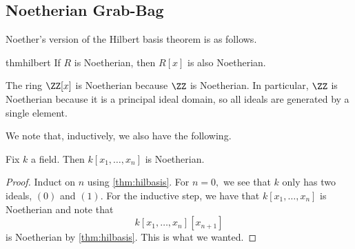 \subsection{Noetherian Grab-Bag}
Noether's version of the Hilbert basis theorem is as follows.
\begin{restatable}{thm}{hilbert} \label{thm:hilbasis}
	If $R$ is Noetherian, then $R[x]$ is also Noetherian.
\end{restatable}
\begin{ex}
	The ring $\ZZ[x]$ is Noetherian because $\ZZ$ is Noetherian. In particular, $\ZZ$ is Noetherian because it is a principal ideal domain, so all ideals are generated by a single element.
\end{ex}
We note that, inductively, we also have the following.
\begin{cor}
	Fix $k$ a field. Then $k[x_1,\ldots,x_n]$ is Noetherian.
\end{cor}
\begin{proof}
	Induct on $n$ using \autoref{thm:hilbasis}. For $n=0,$ we see that $k$ only has two ideals, $(0)$ and $(1).$ For the inductive step, we have that $k[x_1,\ldots,x_n]$ is Noetherian and note that
	\[k[x_1,\ldots,x_n][x_{n+1}]\]
	is Noetherian by \autoref{thm:hilbasis}. This is what we wanted.
\end{proof}

